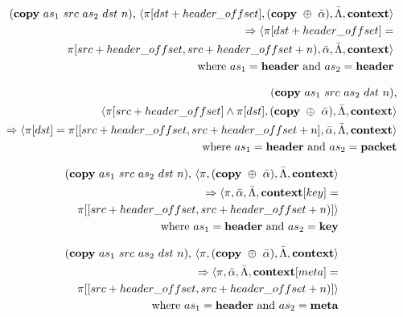 \begin{equation}
\begin{split}
  (\textrm{\textbf{copy}} \ as_1 \ src \ as_2 \ dst \ n)
  \textrm{,} \ \langle \pi[dst + header\_offset], (\textrm{\textbf{copy}} \ \oplus \ \bar \alpha), \bar \Lambda, \textrm{\textbf{context}} \rangle \\
  \Rightarrow
  \langle \pi[dst + header\_offset] = \\ \pi[src + header\_offset, src + header\_offset + n),
  \bar \alpha, \bar \Lambda, \textrm{\textbf{context}} \rangle \\
    \textrm{where} \ as_1 = \textrm{\textbf{header} and } as_2 =
    \textrm{\textbf{header}}
\end{split}
\end{equation}

\begin{equation}
\begin{split}
  (\textrm{\textbf{copy}} \ as_1 \ src \ as_2 \ dst \ n)
  \textrm{,} \\ \langle \pi[src + header\_offset] \wedge \pi[dst], (\textrm{\textbf{copy}} \ \oplus \ \bar \alpha), \bar \Lambda, \textrm{\textbf{context}} \rangle \\  
  \Rightarrow
  \langle \pi[dst] = \pi[[src + header\_offset, src + header\_offset + n], \bar \alpha, \bar \Lambda, \textrm{\textbf{context}} \rangle \\  
    \textrm{where} \ as_1 = \textrm{\textbf{header} and } as_2 =
    \textrm{\textbf{packet}}
\end{split}
\end{equation}

\begin{equation}
\begin{split}
  (\textrm{\textbf{copy}} \ as_1 \ src \ as_2 \ dst \ n)
  \textrm{,} \ \langle \pi, (\textrm{\textbf{copy}} \ \oplus \ \bar \alpha), \bar \Lambda, \textrm{\textbf{context}} \rangle \\
  \Rightarrow
  \langle \pi, \bar \alpha, \bar \Lambda, \textrm{\textbf{context}}[key] = \\\pi[[src + header\_offset, src + header\_offset + n)] \rangle \\
    \textrm{where} \ as_1 = \textrm{\textbf{header} and } as_2 =
    \textrm{\textbf{key}}
\end{split}
\end{equation}

\begin{equation}
\begin{split}
  (\textrm{\textbf{copy}} \ as_1 \ src \ as_2 \ dst \ n)
  \textrm{,} \ \langle \pi, (\textrm{\textbf{copy}} \ \oplus \ \bar \alpha), \bar \Lambda, \textrm{\textbf{context}} \rangle \\
  \Rightarrow
  \langle \pi, \bar \alpha, \bar \Lambda, \textrm{\textbf{context}}[meta] = \\ \pi[[src + header\_offset, src + header\_offset + n)] \rangle \\
    \textrm{where} \ as_1 = \textrm{\textbf{header} and } as_2 =
    \textrm{\textbf{meta}}
\end{split}
\end{equation}
